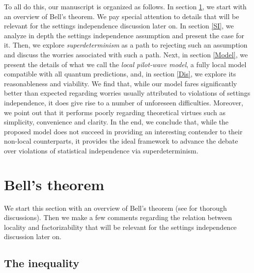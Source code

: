 \documentclass[letterpaper,12pt]{article}
\begin{document}
To all do this, our manuscript is organized as follows. In section \ref{bell's theorem}, we start with an overview of Bell's theorem. We pay special attention to details that will be relevant for the settings independence discussion later on. In section \ref{SI}, we analyze in depth the settings independence assumption and present the case for it. Then, we explore \emph{superdeterminism} as a path to rejecting such an assumption and discuss the worries associated with such a path. Next, in section \ref{Model}, we present the details of what we call the \emph{local pilot-wave model}, a fully local model compatible with all quantum predictions, and, in section \ref{Dis}, we explore its reasonableness and viability. We find that, while our model fares significantly better than expected regarding worries usually attributed to violations of settings independence, it does give rise to a number of unforeseen difficulties. Moreover, we point out that it performs poorly regarding theoretical virtues such as simplicity, convenience and clarity. In the end, we conclude that, while the proposed model does not succeed in providing an interesting contender to their non-local counterparts, it provides the ideal framework to advance the debate over violations of statistical independence via superdeterminism.
\section{Bell's theorem}
\label{bell's theorem}

We start this section with an overview of Bell's theorem (see \cite{Myrvold,Scholar} for thorough discussions). Then we make a few comments regarding the relation between locality and factorizability that will be relevant for the settings independence discussion later on.

\subsection{The inequality}
\end{document}

